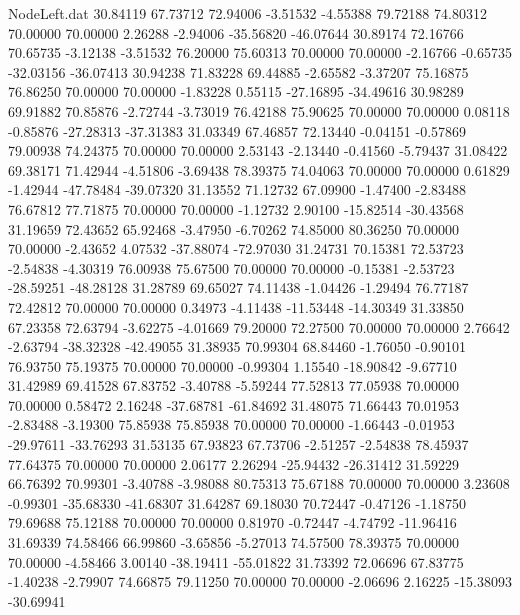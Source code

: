 \begin{filecontents}{NodeLeft.dat}
  30.84119   67.73712   72.94006    -3.51532   -4.55388   79.72188   74.80312   70.00000   70.00000    2.26288   -2.94006  -35.56820  -46.07644
  30.89174   72.16766   70.65735    -3.12138   -3.51532   76.20000   75.60313   70.00000   70.00000   -2.16766   -0.65735  -32.03156  -36.07413
  30.94238   71.83228   69.44885    -2.65582   -3.37207   75.16875   76.86250   70.00000   70.00000   -1.83228    0.55115  -27.16895  -34.49616
  30.98289   69.91882   70.85876    -2.72744   -3.73019   76.42188   75.90625   70.00000   70.00000    0.08118   -0.85876  -27.28313  -37.31383
  31.03349   67.46857   72.13440    -0.04151   -0.57869   79.00938   74.24375   70.00000   70.00000    2.53143   -2.13440   -0.41560   -5.79437
  31.08422   69.38171   71.42944    -4.51806   -3.69438   78.39375   74.04063   70.00000   70.00000    0.61829   -1.42944  -47.78484  -39.07320
  31.13552   71.12732   67.09900    -1.47400   -2.83488   76.67812   77.71875   70.00000   70.00000   -1.12732    2.90100  -15.82514  -30.43568
  31.19659   72.43652   65.92468    -3.47950   -6.70262   74.85000   80.36250   70.00000   70.00000   -2.43652    4.07532  -37.88074  -72.97030
  31.24731   70.15381   72.53723    -2.54838   -4.30319   76.00938   75.67500   70.00000   70.00000   -0.15381   -2.53723  -28.59251  -48.28128
  31.28789   69.65027   74.11438    -1.04426   -1.29494   76.77187   72.42812   70.00000   70.00000    0.34973   -4.11438  -11.53448  -14.30349
  31.33850   67.23358   72.63794    -3.62275   -4.01669   79.20000   72.27500   70.00000   70.00000    2.76642   -2.63794  -38.32328  -42.49055
  31.38935   70.99304   68.84460    -1.76050   -0.90101   76.93750   75.19375   70.00000   70.00000   -0.99304    1.15540  -18.90842   -9.67710
  31.42989   69.41528   67.83752    -3.40788   -5.59244   77.52813   77.05938   70.00000   70.00000    0.58472    2.16248  -37.68781  -61.84692
  31.48075   71.66443   70.01953    -2.83488   -3.19300   75.85938   75.85938   70.00000   70.00000   -1.66443   -0.01953  -29.97611  -33.76293
  31.53135   67.93823   67.73706    -2.51257   -2.54838   78.45937   77.64375   70.00000   70.00000    2.06177    2.26294  -25.94432  -26.31412
  31.59229   66.76392   70.99301    -3.40788   -3.98088   80.75313   75.67188   70.00000   70.00000    3.23608   -0.99301  -35.68330  -41.68307
  31.64287   69.18030   70.72447    -0.47126   -1.18750   79.69688   75.12188   70.00000   70.00000    0.81970   -0.72447   -4.74792  -11.96416
  31.69339   74.58466   66.99860    -3.65856   -5.27013   74.57500   78.39375   70.00000   70.00000   -4.58466    3.00140  -38.19411  -55.01822
  31.73392   72.06696   67.83775    -1.40238   -2.79907   74.66875   79.11250   70.00000   70.00000   -2.06696    2.16225  -15.38093  -30.69941

\end{filecontents}
